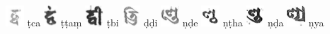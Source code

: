 \documentclass[a4paper,12pt]{article}
\begin{document}
{\noindent
\includegraphics[height=8.0mm]{rtc.jpg} ṭca \includegraphics[height=8.0mm]{ttam.jpg} ṭṭaṃ \includegraphics[height=8.0mm]{rtbi.jpg} ṭbi \includegraphics[height=8.0mm]{rdd.jpg} ḍḍi \includegraphics[height=8.0mm]{rnde.jpg} ṇḍe \includegraphics[height=8.0mm]{ntha.jpg} ṇṭha \includegraphics[height=8.0mm]{nnda.jpg} ṇḍa \includegraphics[height=8.0mm]{nny.jpg} ṇya \\
\noindent
}
\end{document}
